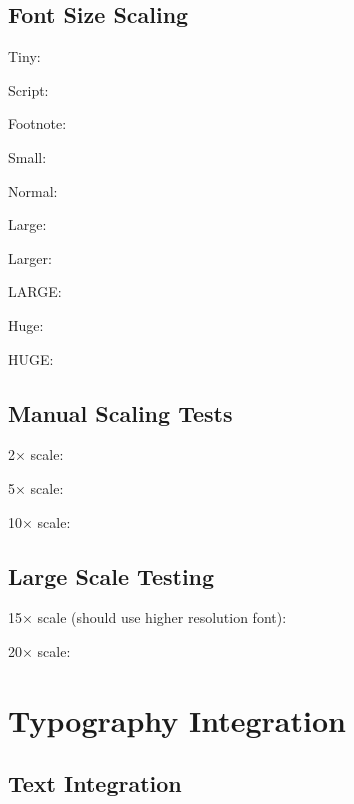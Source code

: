 \documentclass{article}
\begin{document}
\subsection{Font Size Scaling}

Tiny: {\tiny \bahaistar}

Script: {\scriptsize \bahaistar}

Footnote: {\footnotesize \bahaistar}

Small: {\small \bahaistar}

Normal: {\normalsize \bahaistar}

Large: {\large \bahaistar}

Larger: {\Large \bahaistar}

LARGE: {\LARGE \bahaistar}

Huge: {\huge \bahaistar}

HUGE: {\Huge \bahaistar}

\subsection{Manual Scaling Tests}

2× scale: \scalebox{2}{\bahaistar}

5× scale: \scalebox{5}{\bahaistar}

10× scale: \scalebox{10}{\bahaistar}

\newpage

\subsection{Large Scale Testing}

15× scale (should use higher resolution font):

\begin{center}
\scalebox{15}{\bahaistar}
\end{center}

20× scale:

\begin{center}
\scalebox{20}{\bahaistar}
\end{center}

\section{Typography Integration}

\subsection{Text Integration}
\end{document}
